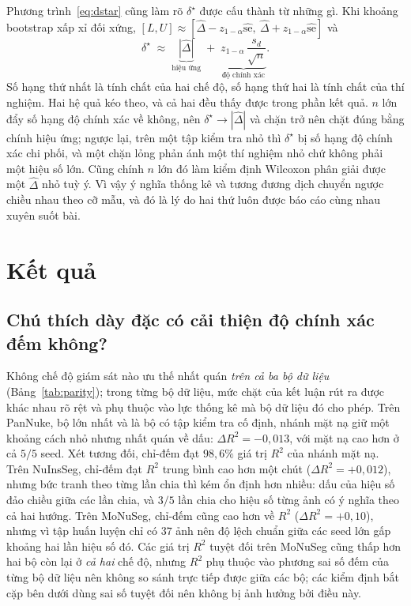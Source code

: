 \documentclass[preprint,12pt]{elsarticle}
\begin{document}
Phương trình~\eqref{eq:dstar} cũng làm rõ $\delta^\star$ được cấu thành từ những gì. Khi khoảng bootstrap xấp xỉ
đối xứng, $[L,U] \approx [\hat{\Delta} - z_{1-\alpha}\widehat{\mathrm{se}},\
\hat{\Delta} + z_{1-\alpha}\widehat{\mathrm{se}}]$ và
\begin{equation}\label{eq:dstardecomp}
\delta^\star \;\approx\; \underbrace{|\hat{\Delta}|}_{\text{hiệu ứng}} \;+\;
\underbrace{z_{1-\alpha}\,\frac{s_d}{\sqrt{n}}}_{\text{độ chính xác}} .
\end{equation}
Số hạng thứ nhất là tính chất của hai chế độ, số hạng thứ hai là tính chất của thí nghiệm. Hai hệ quả kéo theo, và
cả hai đều thấy được trong phần kết quả. $n$ lớn đẩy số hạng độ chính xác về không, nên
$\delta^\star \to |\hat{\Delta}|$ và chặn trở nên chặt đúng bằng chính hiệu ứng; ngược lại, trên một tập kiểm tra
nhỏ thì $\delta^\star$ bị số hạng độ chính xác chi phối, và một chặn lỏng phản ánh một thí nghiệm nhỏ chứ không
phải một hiệu số lớn. Cũng chính $n$ lớn đó làm kiểm định Wilcoxon phân giải được một $\hat{\Delta}$ nhỏ tuỳ ý. Vì
vậy ý nghĩa thống kê và tương đương dịch chuyển ngược chiều nhau theo cỡ mẫu, và đó là lý do hai thứ luôn được báo
cáo cùng nhau xuyên suốt bài.

\section{Kết quả}\label{sec:results}

\subsection{Chú thích dày đặc có cải thiện độ chính xác đếm không?}\label{sec:parity}

Không chế độ giám sát nào ưu thế nhất quán \emph{trên cả ba bộ dữ liệu} (Bảng~\ref{tab:parity}); trong từng bộ dữ
liệu, mức chặt của kết luận rút ra được khác nhau rõ rệt và phụ thuộc vào lực thống kê mà bộ dữ liệu đó cho phép.
Trên PanNuke, bộ lớn nhất và là bộ có tập kiểm tra cố định, nhánh mặt nạ giữ một khoảng cách nhỏ nhưng nhất quán
về dấu: $\Delta R^2 = -0{,}013$, với mặt nạ cao hơn ở cả $5/5$ seed. Xét tương đối, chỉ-đếm đạt $98{,}6\%$ giá trị
$R^2$ của nhánh mặt nạ. Trên NuInsSeg, chỉ-đếm đạt $R^2$ trung bình cao hơn một chút ($\Delta R^2 = +0{,}012$),
nhưng bức tranh theo từng lần chia thì kém ổn định hơn nhiều: dấu của hiệu số đảo chiều giữa các lần chia, và
$3/5$ lần chia cho hiệu số từng ảnh có ý nghĩa theo cả hai hướng. Trên MoNuSeg, chỉ-đếm cũng cao hơn về $R^2$
($\Delta R^2 = +0{,}10$), nhưng vì tập huấn luyện chỉ có $37$ ảnh nên độ lệch chuẩn giữa các seed lớn gấp khoảng
hai lần hiệu số đó. Các giá trị $R^2$ tuyệt đối trên MoNuSeg cũng thấp hơn hai bộ còn lại ở \emph{cả hai} chế độ,
nhưng $R^2$ phụ thuộc vào phương sai số đếm của từng bộ dữ liệu nên không so sánh trực tiếp được giữa các bộ; các
kiểm định bắt cặp bên dưới dùng sai số tuyệt đối nên không bị ảnh hưởng bởi điều này.
\end{document}
